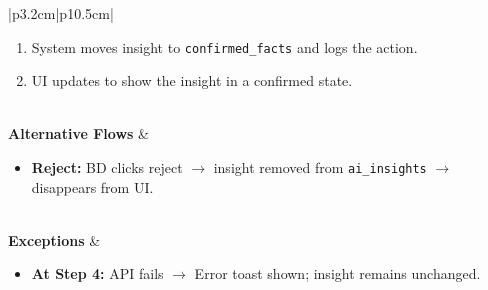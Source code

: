 \documentclass[a4paper]{article}
\begin{document}
\begin{table}[H]
\begin{tabular}{|p{3.2cm}|p{10.5cm}|}
\begin{minipage}[t]{\linewidth}
\begin{enumerate}[nosep,leftmargin=*]
  \item System moves insight to \texttt{confirmed\_facts} and 
  logs the action.
  \item UI updates to show the insight in a confirmed state.
\end{enumerate}
\end{minipage} \\
\hline
\textbf{Alternative Flows} &
\begin{minipage}[t]{\linewidth}
\begin{itemize}[nosep,leftmargin=*]
  \item \textbf{Reject:} BD clicks reject $\rightarrow$ insight 
  removed from \texttt{ai\_insights} $\rightarrow$ disappears 
  from UI.
\end{itemize}
\end{minipage} \\
\hline
\textbf{Exceptions} &
\begin{minipage}[t]{\linewidth}
\begin{itemize}[nosep,leftmargin=*]
  \item \textbf{At Step 4:} API fails $\rightarrow$ Error toast 
  shown; insight remains unchanged.
\end{itemize}
\end{minipage} \\
\hline
\end{tabular}
\end{table}
\end{document}
